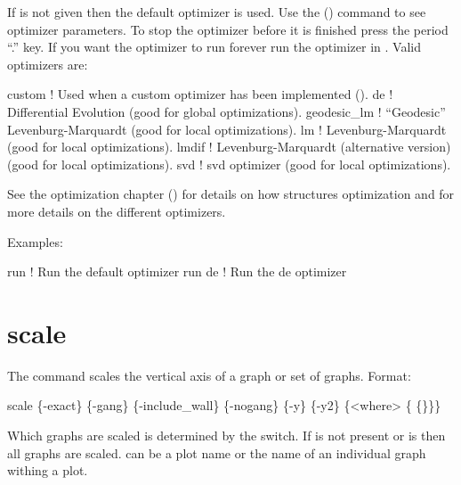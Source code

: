 If  is not given then the default optimizer is used.  Use the 
() command to see optimizer parameters.  To stop the optimizer before it is
finished press the period ``.''  key. If you want the optimizer to run forever run the optimizer in
. Valid optimizers are:
\begin{example}
  custom        ! Used when a custom optimizer has been implemented ().
  de            ! Differential Evolution (good for global optimizations).
  geodesic_lm   ! ``Geodesic'' Levenburg-Marquardt (good for local optimizations).
  lm            ! Levenburg-Marquardt (good for local optimizations).
  lmdif         ! Levenburg-Marquardt (alternative version) (good for local optimizations).
  svd           ! svd optimizer (good for local optimizations).
\end{example}

See the optimization chapter () for details on how \tao structures optimization and for
more details on the different optimizers.

Examples:
\begin{example}
  run         ! Run the default optimizer
  run de      ! Run the de optimizer
\end{example}

\section{scale}
\label{s:scale}

The  command scales the vertical axis of a graph or set of graphs.  Format:
\begin{example}
  scale \{-exact\} \{-gang\} \{-include_wall\} \{-nogang\} 
             \{-y\} \{-y2\} \{<where> \{<value1> \{<value2>\}\}\}
\end{example}

Which graphs are scaled is determined by the  switch. If  is not present or
 is  then all graphs are scaled.  can be a plot name or the name of
an individual graph withing a plot.

